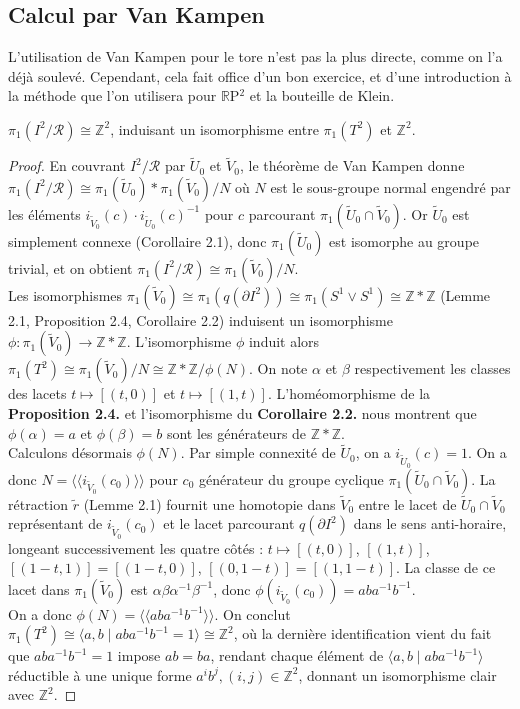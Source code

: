 \subsection{Calcul par Van Kampen}
L'utilisation de Van Kampen pour le tore n'est pas la plus directe, comme on l'a déjà soulevé. Cependant, cela fait office d'un bon exercice, et d'une introduction à la méthode que l'on utilisera pour $\mathbb{R}$P$^2$ et la bouteille de Klein.
\begin{proposition}
    $\pi_1(I^2/\mathcal{R})\cong\mathbb{Z}^2$, induisant un isomorphisme entre $\pi_1(T^2)$ et $\mathbb{Z}^2$.
\end{proposition}
\begin{proof}
    En couvrant $I^2/\mathcal{R}$ par $\tilde{U}_0$ et $\tilde{V}_0$, le théorème de Van Kampen donne $\pi_1(I^2/\mathcal{R}) \cong \pi_1(\tilde{U}_0) * \pi_1(\tilde{V}_0) / N$ où $N$ est le sous-groupe normal engendré par les éléments $i_{\tilde{V}_0}(c) \cdot i_{\tilde{U}_0}(c)^{-1}$ pour $c$ parcourant $\pi_1(\tilde{U}_0 \cap \tilde{V}_0)$. Or $\tilde{U}_0$ est simplement connexe (Corollaire 2.1), donc $\pi_1(\tilde{U}_0)$ est isomorphe au groupe trivial, et on obtient $\pi_1(I^2/\mathcal{R}) \cong \pi_1(\tilde{V}_0)/N$.\medskip\\
    Les isomorphismes $\pi_1(\tilde{V}_0) \cong \pi_1(q(\partial I^2)) \cong \pi_1(S^1 \vee S^1) \cong \mathbb{Z} * \mathbb{Z}$ (Lemme 2.1, Proposition 2.4, Corollaire 2.2) induisent un isomorphisme $\phi : \pi_1(\tilde{V}_0) \rightarrow\mathbb{Z} * \mathbb{Z}$. L'isomorphisme $\phi$ induit alors $\pi_1(T^2) \cong \pi_1(\tilde{V}_0)/N \cong \mathbb{Z}*\mathbb{Z}/\phi(N)$. On note $\alpha$ et $\beta$ respectivement les classes des lacets $t \mapsto [(t, 0)]$ et $t \mapsto [(1, t)]$. L'homéomorphisme de la \textbf{Proposition 2.4.} et l'isomorphisme du \textbf{Corollaire 2.2.} nous montrent que $\phi(\alpha)=a$ et $\phi(\beta)=b$ sont les générateurs de $\mathbb{Z}*\mathbb{Z}$.\medskip\\
    Calculons désormais $\phi(N)$. Par simple connexité de $\tilde{U}_0$, on a $i_{\tilde{U}_0}(c)=1$. On a donc $N=\langle\langle i_{\tilde{V}_0}(c_0)\rangle\rangle$ 
     pour $c_0$ générateur du groupe cyclique $\pi_1(\tilde{U}_0\cap\tilde{V}_0)$. La rétraction $\tilde{r}$ (Lemme 2.1) fournit une homotopie dans $\tilde{V}_0$ entre le lacet de $\tilde{U}_0\cap\tilde{V}_0$ représentant de $i_{\tilde{V}_0}(c_0)$ et le lacet parcourant $q(\partial I^2)$ dans le sens anti-horaire, longeant successivement les quatre côtés : $t \mapsto [(t,0)]$, $[(1,t)]$, $[(1-t,1)]=[(1-t,0)]$, $[(0,1-t)]=[(1,1-t)]$. La classe de ce lacet dans $\pi_1(\tilde{V}_0)$ est $\alpha\beta\alpha^{-1}\beta^{-1}$, donc $\phi(i_{\tilde{V}_0}(c_0)) = aba^{-1}b^{-1}$.\medskip\\
     On a donc $\phi(N) = \langle\langle aba^{-1}b^{-1}\rangle\rangle$. On conclut $\pi_1(T^2) \cong \langle a, b \mid aba^{-1}b^{-1} = 1\rangle \cong \mathbb{Z}^2$, où la dernière identification vient du fait que $aba^{-1}b^{-1}=1$ impose $ab=ba$, rendant chaque élément de $\langle a,b\mid aba^{-1}b^{-1}\rangle$ réductible à une unique forme $a^ib^j,(i,j)\in\mathbb{Z}^2$, donnant un isomorphisme clair avec $\mathbb{Z}^2$.
\end{proof}

